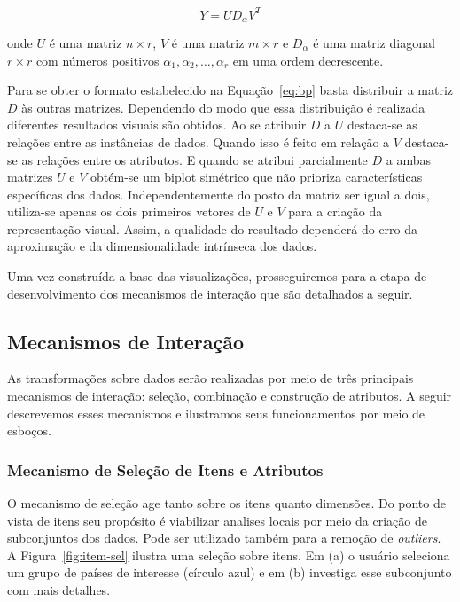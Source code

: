 \begin{equation}
    Y = UD_{\alpha}V^T
\end{equation}

onde $U$ é uma matriz $n \times r$, $V$ é uma matriz $m
\times r$ e $D_\alpha$ é uma matriz diagonal $r \times r$
com números positivos $\alpha_1,\alpha_2,\ldots,\alpha_r$ em
uma ordem decrescente. 

Para se obter o formato estabelecido na Equação~\ref{eq:bp}
basta distribuir a matriz $D$ às outras matrizes. Dependendo
do modo que essa distribuição é realizada diferentes
resultados visuais são obtidos. Ao se atribuir $D$ a $U$
destaca-se as relações entre as instâncias de dados. Quando
isso é feito em relação a $V$ destaca-se as relações entre
os atributos. E quando se atribui parcialmente $D$ a ambas
matrizes $U$ e $V$ obtém-se um biplot simétrico que não
prioriza características específicas dos dados.
Independentemente do posto da matriz ser igual a dois,
utiliza-se apenas os dois primeiros vetores de $U$ e $V$
para a criação da representação visual. Assim, a qualidade
do resultado dependerá do erro da aproximação e da
dimensionalidade intrínseca dos dados. 

Uma vez construída a base das visualizações, 
prosseguiremos para a etapa de desenvolvimento dos
mecanismos de interação que são detalhados a seguir.

\subsection{Mecanismos de Interação}

As transformações sobre dados serão realizadas
por meio de três principais mecanismos de interação:
seleção, combinação e construção de atributos. A seguir
descrevemos esses mecanismos e ilustramos seus
funcionamentos por meio de esboços.

\subsubsection{Mecanismo de Seleção de Itens e Atributos}

O mecanismo de seleção age tanto sobre os itens quanto
dimensões. Do ponto de vista de itens seu propósito é
viabilizar analises locais por meio da criação de
subconjuntos dos dados. Pode ser utilizado também para a
remoção de \emph{outliers}. A Figura~\ref{fig:item-sel}
ilustra uma seleção sobre itens. Em (a) o usuário seleciona
um grupo de países de interesse (círculo azul) e em (b)
investiga esse subconjunto com mais detalhes. 

